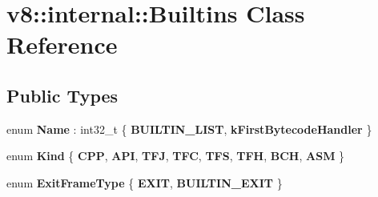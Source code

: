 \hypertarget{classv8_1_1internal_1_1Builtins}{}\section{v8\+:\+:internal\+:\+:Builtins Class Reference}
\label{classv8_1_1internal_1_1Builtins}
\subsection*{Public Types}
\begin{DoxyCompactItemize}
\item 
\mbox{\label{classv8_1_1internal_1_1Builtins_a7bed3cdecadcd0dc8acf6c5bcafcc321}} 
enum {\bfseries Name} \+: int32\+\_\+t \{ {\bfseries B\+U\+I\+L\+T\+I\+N\+\_\+\+L\+I\+ST}, 
{\bfseries k\+First\+Bytecode\+Handler}
 \}
\item 
\mbox{\label{classv8_1_1internal_1_1Builtins_a4b4b44a12366239fe85e8b802150a05e}} 
enum {\bfseries Kind} \{ \newline
{\bfseries C\+PP}, 
{\bfseries A\+PI}, 
{\bfseries T\+FJ}, 
{\bfseries T\+FC}, 
\newline
{\bfseries T\+FS}, 
{\bfseries T\+FH}, 
{\bfseries B\+CH}, 
{\bfseries A\+SM}
 \}
\item 
\mbox{\label{classv8_1_1internal_1_1Builtins_a25980ddcd1fa714c819471480cbd87ff}} 
enum {\bfseries Exit\+Frame\+Type} \{ {\bfseries E\+X\+IT}, 
{\bfseries B\+U\+I\+L\+T\+I\+N\+\_\+\+E\+X\+IT}
 \}
\end{DoxyCompactItemize}
